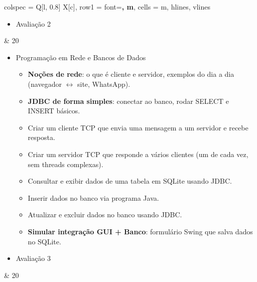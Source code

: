 \documentclass[a4paper, 12pt]{article}
\begin{document}
\begin{longtblr}{colspec = {Q[l, 0.8\textwidth] X[c]},
        row{1} = {font=\bfseries, m},
        cells = {m},
        hlines, vlines
        }
\begin{itemize}
\begin{itemize}
                \item \textbf{Arquivos de texto}: leitura/escrita com \texttt{FileReader}, \texttt{BufferedReader}, \texttt{PrintWriter}.
                \item \textbf{Threads em Java}: criar e iniciar uma \texttt{Thread}, diferença entre executar em série e em paralelo.
                \item Ler e gravar dados de usuários em arquivo (cadastro simples).
                \item Ler e escrever arquivos CSV (usando \texttt{split}).
                \item Ler um arquivo linha a linha e processar dados (contagem de palavras, caracteres).
                \item Uso básico de serialização (\texttt{ObjectOutputStream} / \texttt{ObjectInputStream}).
                \item Threads com \texttt{Runnable}: executar uma tarefa em paralelo.
                \item Threads para simular operações demoradas (ex: cálculo de primos, espera com \texttt{sleep}).
            \end{itemize}
        \item Avaliação 2
    \end{itemize} & 20\\
    \begin{itemize}
        \item Programação em Rede e Bancos de Dados
            \begin{itemize}
                \item \textbf{Noções de rede}: o que é cliente e servidor, exemplos do dia a dia (navegador $\leftrightarrow$ site, WhatsApp).
                \item \textbf{JDBC de forma simples}: conectar ao banco, rodar SELECT e INSERT básicos.
                \item Criar um cliente TCP que envia uma mensagem a um servidor e recebe resposta.
                \item Criar um servidor TCP que responde a vários clientes (um de cada vez, sem threads complexas).
                \item Consultar e exibir dados de uma tabela em SQLite usando JDBC.
                \item Inserir dados no banco via programa Java.
                \item Atualizar e excluir dados no banco usando JDBC.
                \item \textbf{Simular integração GUI + Banco}: formulário Swing que salva dados no SQLite.
            \end{itemize}
        \item Avaliação 3
    \end{itemize} & 20\\
\end{longtblr}
\end{document}
